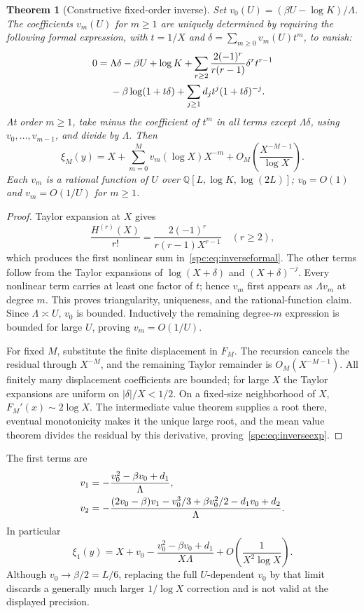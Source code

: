 \documentclass[11pt,letterpaper]{article}
\newtheorem{theorem}{Theorem}[section]
\theoremstyle{definition}\newtheorem{definition}[theorem]{Definition}
\theoremstyle{remark}\newtheorem{remark}[theorem]{Remark}
\newcommand{\Q}{\mathbb Q}
\begin{document}
\begin{theorem}[Constructive fixed-order inverse]\label{spc:thm:inverse}
Set $v_0(U)=(\beta U-\log K)/\Lambda$. The coefficients $v_m(U)$ for $m\ge1$ are uniquely determined by requiring the following formal expression, with $t=1/X$ and $\delta=\sum_{m\ge0}v_m(U)t^m$, to vanish:
\begin{align}\label{spc:eq:inverseformal}
 0={}&\Lambda\delta-\beta U+\log K
 +\sum_{r\ge2}\frac{2(-1)^r}{r(r-1)}\delta^rt^{r-1}\notag\\
 &-\beta\log(1+t\delta)
 +\sum_{j\ge1}d_jt^j(1+t\delta)^{-j}.
\end{align}
At order $m\ge1$, take minus the coefficient of $t^m$ in all terms except $\Lambda\delta$, using $v_0,\ldots,v_{m-1}$, and divide by $\Lambda$. Then
\begin{equation}\label{spc:eq:inverseexp}
 \xi_M(y)=X+\sum_{m=0}^Mv_m(\log X)X^{-m}
                 +O_M\!\left(\frac{X^{-M-1}}{\log X}\right).
\end{equation}
Each $v_m$ is a rational function of $U$ over
$\Q[L,\log K,\log(2L)]$; $v_0=O(1)$ and $v_m=O(1/U)$ for $m\ge1$.
\end{theorem}
\begin{proof}
Taylor expansion at $X$ gives
\[
 \frac{H^{(r)}(X)}{r!}=\frac{2(-1)^r}{r(r-1)X^{r-1}}\quad(r\ge2),
\]
which produces the first nonlinear sum in~\eqref{spc:eq:inverseformal}. The other terms follow from the Taylor expansions of $\log(X+\delta)$ and $(X+\delta)^{-j}$. Every nonlinear term carries at least one factor of $t$; hence $v_m$ first appears as $\Lambda v_m$ at degree $m$. This proves triangularity, uniqueness, and the rational-function claim. Since $\Lambda\asymp U$, $v_0$ is bounded. Inductively the remaining degree-$m$ expression is bounded for large $U$, proving $v_m=O(1/U)$.

For fixed $M$, substitute the finite displacement in $F_M$. The recursion cancels the residual through $X^{-M}$, and the remaining Taylor remainder is $O_M(X^{-M-1})$. All finitely many displacement coefficients are bounded; for large $X$ the Taylor expansions are uniform on $|\delta|/X<1/2$. On a fixed-size neighborhood of $X$, $F_M'(x)\sim2\log X$. The intermediate value theorem supplies a root there, eventual monotonicity makes it the unique large root, and the mean value theorem divides the residual by this derivative, proving~\eqref{spc:eq:inverseexp}.
\end{proof}
The first terms are
\begin{align}\label{spc:eq:v12}
 v_1&=-\frac{v_0^2-\beta v_0+d_1}{\Lambda},\notag\\
 v_2&=-\frac{(2v_0-\beta)v_1-v_0^3/3+\beta v_0^2/2-d_1v_0+d_2}{\Lambda}.
\end{align}
In particular
\[
 \xi_1(y)=X+v_0-\frac{v_0^2-\beta v_0+d_1}{X\Lambda}
              +O\!\left(\frac1{X^2\log X}\right).
\]
Although $v_0\to\beta/2=L/6$, replacing the full $U$-dependent $v_0$ by that limit discards a generally much larger $1/\log X$ correction and is not valid at the displayed precision.
\end{document}
